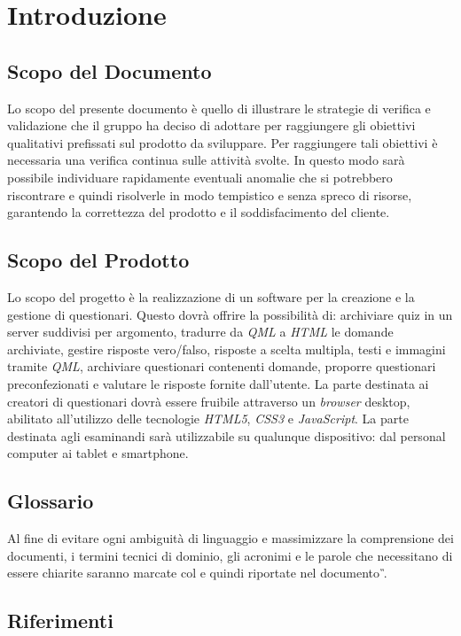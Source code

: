 \section{Introduzione}
\subsection{Scopo del Documento}
Lo scopo del presente documento è quello di illustrare le strategie di verifica e validazione che il gruppo \gruppo \hspace{1mm} ha deciso di adottare per raggiungere gli obiettivi qualitativi prefissati sul prodotto da sviluppare. Per raggiungere tali obiettivi è necessaria una verifica continua sulle attività svolte. In questo modo sarà possibile individuare rapidamente eventuali anomalie che si potrebbero riscontrare e quindi risolverle in modo tempistico e senza spreco di risorse, garantendo la correttezza del prodotto e il soddisfacimento del cliente.

\subsection{Scopo del Prodotto}
Lo scopo del progetto è la realizzazione di un software per la creazione e la gestione di questionari. Questo dovrà offrire la possibilità di: archiviare quiz in un server suddivisi per argomento, tradurre da \textit{QML} a \textit{HTML} le domande archiviate, gestire risposte vero/falso, risposte a scelta multipla, testi e immagini tramite \textit{QML}, archiviare questionari contenenti domande, proporre questionari preconfezionati e valutare le risposte fornite dall’utente.
La parte destinata ai creatori di questionari dovrà essere fruibile attraverso un \textit{browser} desktop, abilitato all’utilizzo delle tecnologie \textit{HTML5}, \textit{CSS3} e \textit{JavaScript}.
La parte destinata agli esaminandi sarà utilizzabile su qualunque dispositivo: dal personal computer ai tablet e smartphone.

\subsection{Glossario}
Al fine di evitare ogni ambiguità di linguaggio e massimizzare la comprensione dei documenti, i termini tecnici di dominio, gli acronimi e le parole che necessitano di essere chiarite saranno marcate col  e quindi riportate nel documento \textit{\G}.
\subsection{Riferimenti}

